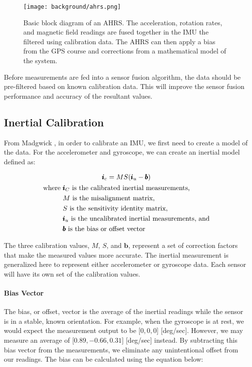 \begin{figure}[h!]
    \caption[AHRS block diagram]{Basic block diagram of an AHRS. 
    The acceleration, rotation rates, and magnetic field readings are fused together in the IMU the filtered using calibration data. 
    The AHRS can then apply a bias from the GPS course and corrections from a mathematical model of the system.}
    \centering
    \texttt{[image: background/ahrs.png]}
\end{figure}

Before measurements are fed into a sensor fusion algorithm, the data should be pre-filtered based on known calibration data.
This will improve the sensor fusion performance and accuracy of the resultant values.

\subsection{Inertial Calibration}

From Madgwick \cite{Madgwick:dissertation}, in order to calibrate an IMU, we first need to create a model of the data. For the accelerometer and gyroscope, we can create an inertial model defined as:

\begin{gather} \labeq{inertial_model}
    \pmb{i}_c=MS(\pmb{i}_u-\pmb{b}) \\
    \begin{aligned}
        \text{where } & \pmb{i}_C \text{ is the calibrated inertial measurements,} \\ 
        & M \text{ is the misalignment matrix,} \\
        & S \text{ is the sensitivity identity matrix,} \\
        & \pmb{i}_u \text{ is the uncalibrated inertial measurements, and} \\
        & \pmb{b} \text{ is the bias or offset vector}
    \end{aligned} \notag
\end{gather}

The three calibration values, $M$, $S$, and $\pmb{b}$, represent a set of correction factors that make the measured values more accurate. The inertial measurement is generalized here to represent either accelerometer or gyroscope data. Each sensor will have its own set of the calibration values.

\paragraph*{Bias Vector} The bias, or offset, vector is the average of the inertial readings while the sensor is in a stable, known orientation. For example, when the gyroscope is at rest, we would expect the measurement output to be $\lbrack 0,0,0 \rbrack$ [deg/sec]. However, we may measure an average of $\lbrack 0.89, -0.66, 0.31 \rbrack$ [deg/sec] instead. By subtracting this bias vector from the measurements, we eliminate any unintentional offset from our readings. The bias can be calculated using the equation below:

